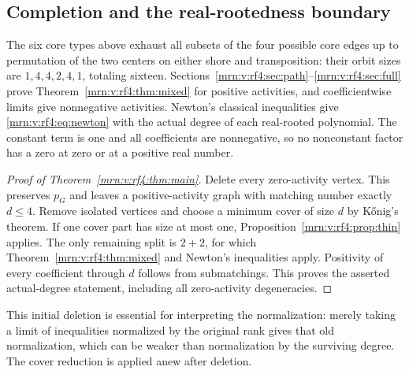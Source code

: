 \documentclass[11pt,a4paper]{article}
\theoremstyle{remark}\newtheorem{remark}[theorem]{Remark}
\begin{document}
\subsection{Completion and the real-rootedness boundary}\label{mrn:v:rf4:sec:completion}

The six core types above exhaust all subsets of the four possible core edges up to permutation of the two centers on either shore and transposition: their orbit sizes are $1,4,4,2,4,1$, totaling sixteen. Sections~\ref{mrn:v:rf4:sec:path}--\ref{mrn:v:rf4:sec:full} prove Theorem~\ref{mrn:v:rf4:thm:mixed} for positive activities, and coefficientwise limits give nonnegative activities. Newton's classical inequalities give \eqref{mrn:v:rf4:eq:newton} with the actual degree of each real-rooted polynomial. The constant term is one and all coefficients are nonnegative, so no nonconstant factor has a zero at zero or at a positive real number.

\begin{proof}[Proof of Theorem~\ref{mrn:v:rf4:thm:main}]
Delete every zero-activity vertex. This preserves $p_G$ and leaves a positive-activity graph with matching number exactly $d\le4$. Remove isolated vertices and choose a minimum cover of size $d$ by K\H{o}nig's theorem. If one cover part has size at most one, Proposition~\ref{mrn:v:rf4:prop:thin} applies. The only remaining split is $2+2$, for which Theorem~\ref{mrn:v:rf4:thm:mixed} and Newton's inequalities apply. Positivity of every coefficient through $d$ follows from submatchings. This proves the asserted actual-degree statement, including all zero-activity degeneracies.
\end{proof}

This initial deletion is essential for interpreting the normalization: merely taking a limit of inequalities normalized by the original rank gives that old normalization, which can be weaker than normalization by the surviving degree. The cover reduction is applied anew after deletion.
\end{document}
